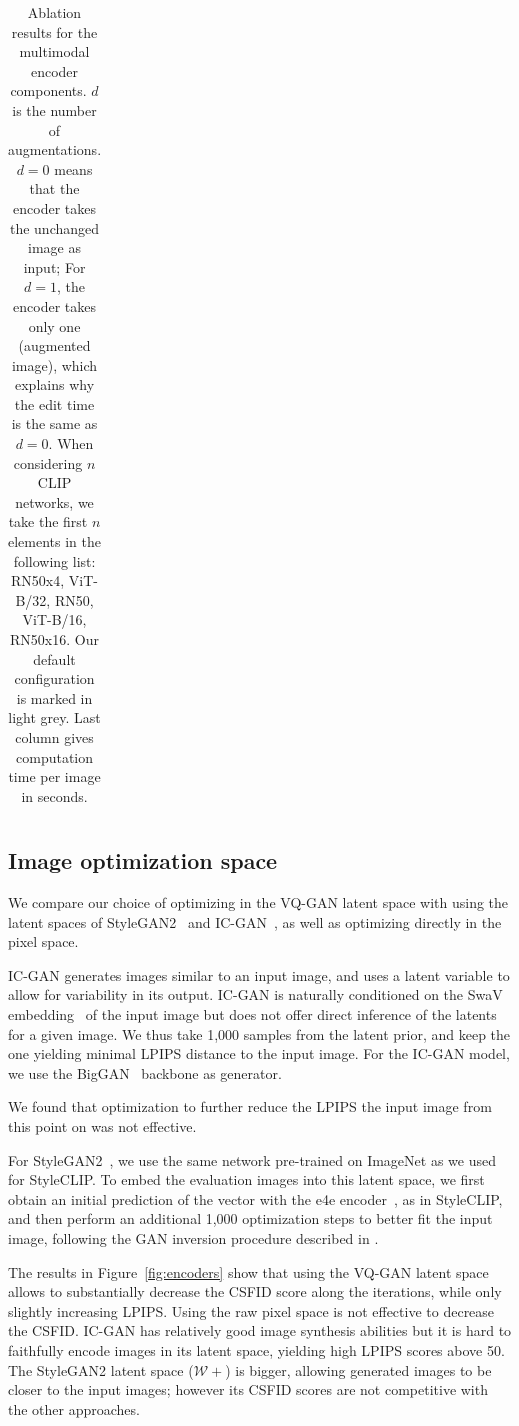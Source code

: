 \begin{table}
\begin{tabular}{lrrrrrr}
\end{tabular}

\caption{\label{table:runtime} Ablation results for the multimodal encoder components. $d$ is the number of augmentations. 
$d=0$ means that the encoder takes the unchanged image as input; For $d=1$, the encoder takes only one (augmented image), 
which explains why the edit time is the same as $d=0$.
When considering $n$ \ac{CLIP} networks, we take the first $n$ elements in the following list: RN50x4, ViT-B/32, RN50, 
ViT-B/16, RN50x16. 
Our default configuration  is marked in light grey. 
Last column gives computation time per image in seconds.
}

\end{table}


\subsection{Image optimization space} 
We compare our choice of optimizing in the VQ-GAN latent space with using the latent
 spaces of StyleGAN2~\cite{karra2020stylegan2} and IC-GAN~\citep{casanova21nips}, as well as 
 optimizing directly in the pixel space.


IC-GAN  generates images similar to an input image, 
and uses  a latent variable to allow for variability in its output. 
IC-GAN is naturally conditioned on the SwaV embedding~\cite{caron20nips} of the input image
but does not offer direct  inference of the latents  for a given image. We thus take 
1,000 samples from the latent prior, and keep the one yielding minimal \ac{LPIPS} distance 
to the input image. 
For the IC-GAN model, 
we use the BigGAN~\citep{brock2018large} 
backbone as generator.

We found that  optimization to further reduce the \ac{LPIPS}  \wrt the input image from this
 point on was not effective.

For StyleGAN2~\cite{karra2020stylegan2}, we use the same  network  pre-trained on ImageNet 
as we used for StyleCLIP.
To embed the evaluation images into this latent space, we first obtain an initial 
prediction of the vector with the e4e encoder~\cite{tov2021designing}, as in StyleCLIP, 
and then  perform an additional 1,000  optimization steps to better fit the input 
image, following the \ac{GAN} inversion procedure described in \cite{karra2019stylegan}.

The results in Figure~\ref{fig:encoders} show that using the VQ-GAN latent space allows 
to substantially decrease the  \ac{CSFID} score along the iterations, while only slightly 
increasing \ac{LPIPS}. 
Using the raw pixel space is not effective to decrease the \ac{CSFID}. 
IC-GAN has relatively good image synthesis abilities but it is hard to faithfully
 encode images in its latent space, yielding high \ac{LPIPS} scores above 50. 
The StyleGAN2 latent space ($\mathcal{W+}$) is bigger, allowing generated images to 
be closer to the input images; however its \ac{CSFID} scores are not competitive with the 
other approaches.

